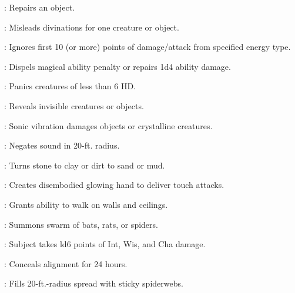 \begin{multicols}{2}
\begin{description*}
\item[\linkspell{Make Whole}:] Repairs an object.
\item[\linkspell{Misdirection}:] Misleads divinations for one creature or object.
\item[\linkspell{Resist Energy}:] Ignores first 10 (or more) points of damage/attack from specified energy type.
\item[\linkspell{Restoration, Lesser}:] Dispels magical ability penalty or repairs 1d4 ability damage.
\item[\linkspell{Scare}:] Panics creatures of less than 6 HD.
\item[\linkspell{See Invisibility}:] Reveals invisible creatures or objects.
\item[\linkspell{Shatter}:] Sonic vibration damages objects or crystalline creatures.
\item[\linkspell{Silence}:] Negates sound in 20-ft. radius.
\item[\linkspell{Soften Earth and Stone}:] Turns stone to clay or dirt to sand or mud.
\item[\linkspell{Spectral Hand}:] Creates disembodied glowing hand to deliver touch attacks.
\item[\linkspell{Spider Climb}:] Grants ability to walk on walls and ceilings.
\item[\linkspell{Summon Swarm}:] Summons swarm of bats, rats, or spiders.
\item[\linkspell{Touch of Idiocy}:] Subject takes ld6 points of Int, Wis, and Cha damage.
\item[\linkspell{Undetectable Alignment}:] Conceals alignment for 24 hours.
\item[\linkspell{Web}:] Fills 20-ft.-radius spread with sticky spiderwebs.
\end{description*}


\end{multicols}

